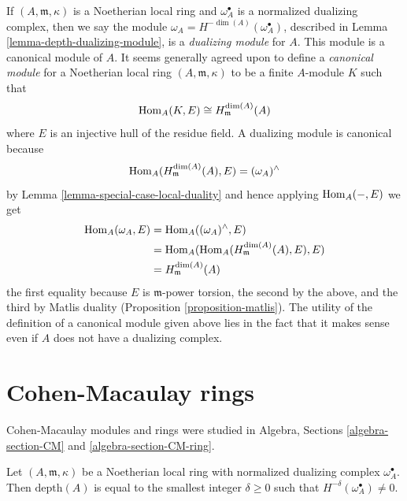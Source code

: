 \noindent
If $(A, \mathfrak m, \kappa)$ is a Noetherian local ring and
$\omega_A^\bullet$ is a normalized dualizing complex, then
we say the module $\omega_A = H^{-\dim(A)}(\omega_A^\bullet)$, described
in Lemma \ref{lemma-depth-dualizing-module},
is a {\it dualizing module}
for $A$. This module is a canonical module of $A$.
It seems generally agreed upon to define a {\it canonical module}
for a Noetherian local ring $(A, \mathfrak m, \kappa)$ to be
a finite $A$-module $K$ such that
$$
\mathop{\mathrm{Hom}}\nolimits_A(K, E) \cong H^{\dim(A)}_\mathfrak m(A)
$$
where $E$ is an injective hull of the residue field. A dualizing
module is canonical because
$$
\mathop{\mathrm{Hom}}\nolimits_A(H^{\dim(A)}_\mathfrak m(A), E) = (\omega_A)^\wedge
$$
by Lemma \ref{lemma-special-case-local-duality}
and hence applying
$\mathop{\mathrm{Hom}}\nolimits_A(-, E)$ we get
\begin{align*}
\mathop{\mathrm{Hom}}\nolimits_A(\omega_A, E)
& =
\mathop{\mathrm{Hom}}\nolimits_A((\omega_A)^\wedge, E) \\
& =
\mathop{\mathrm{Hom}}\nolimits_A(\mathop{\mathrm{Hom}}\nolimits_A(H^{\dim(A)}_\mathfrak m(A), E), E) \\
& = H^{\dim(A)}_\mathfrak m(A)
\end{align*}
the first equality because $E$ is $\mathfrak m$-power torsion, the
second by the above, and the third by Matlis duality
(Proposition \ref{proposition-matlis}).
The utility of the definition
of a canonical module given above lies in the fact that it makes sense
even if $A$ does not have a dualizing complex.




\section{Cohen-Macaulay rings}
\label{section-CM}

\noindent
Cohen-Macaulay modules and rings were studied in
Algebra, Sections \ref{algebra-section-CM} and \ref{algebra-section-CM-ring}.

\begin{lemma}
\label{lemma-depth-in-terms-dualizing-complex}
Let $(A, \mathfrak m, \kappa)$ be a Noetherian local ring with
normalized dualizing complex $\omega_A^\bullet$.
Then $\text{depth}(A)$ is equal to the smallest integer $\delta \geq 0$
such that $H^{-\delta}(\omega_A^\bullet) \not = 0$.
\end{lemma}


